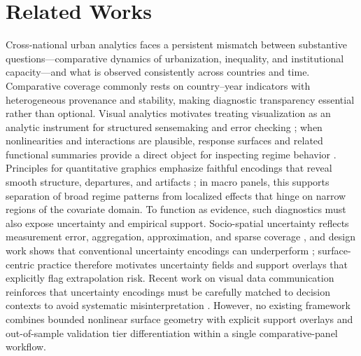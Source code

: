 \documentclass[11pt]{article}
\begin{document}
\section{Related Works}
Cross-national urban analytics faces a persistent mismatch between substantive questions---comparative dynamics of urbanization, inequality, and institutional capacity---and what is observed consistently across countries and time. Comparative coverage commonly rests on country--year indicators with heterogeneous provenance and stability, making diagnostic transparency essential rather than optional. Visual analytics motivates treating visualization as an analytic instrument for structured sensemaking and error checking \parencite{ThomasCook2005IlluminatingPath,Keim2010MasteringVisualAnalytics}; when nonlinearities and interactions are plausible, response surfaces and related functional summaries provide a direct object for inspecting regime behavior \parencite{Hastie2009ESL}. Principles for quantitative graphics emphasize faithful encodings that reveal smooth structure, departures, and artifacts \parencite{Cleveland1993VisualizingData,Tufte2001VisualDisplay}; in macro panels, this supports separation of broad regime patterns from localized effects that hinge on narrow regions of the covariate domain. To function as evidence, such diagnostics must also expose uncertainty and empirical support. Socio-spatial uncertainty reflects measurement error, aggregation, approximation, and sparse coverage \parencite{MacEachren2005VisualizingUncertainty}, and design work shows that conventional uncertainty encodings can underperform \parencite{CorrellGleicher2014ErrorBars,HullmanResnickAdar2015HOPs}; surface-centric practice therefore motivates uncertainty fields and support overlays that explicitly flag extrapolation risk. Recent work on visual data communication reinforces that uncertainty encodings must be carefully matched to decision contexts to avoid systematic misinterpretation \parencite{Franconeri2021ScienceOfVisualData,Padilla2021UncertaintyVis}. However, no existing framework combines bounded nonlinear surface geometry with explicit support overlays and out-of-sample validation tier differentiation within a single comparative-panel workflow.
\end{document}
